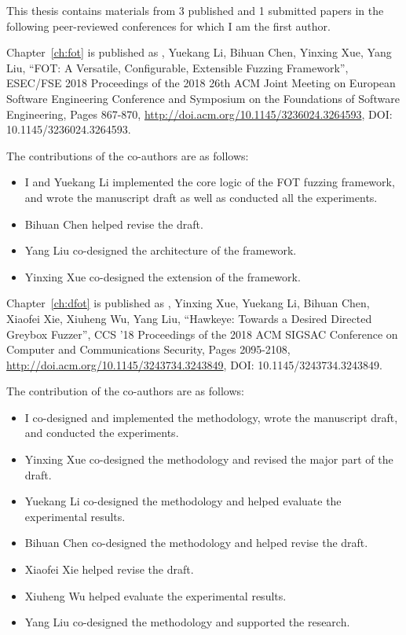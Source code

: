 \noindent This thesis contains materials from 3 published and 1 submitted papers in the following peer-reviewed conferences for which I am the first author.

\noindent Chapter~\ref{ch:fot} is published as \myname, Yuekang Li, Bihuan Chen, Yinxing Xue, Yang Liu, ``FOT: A Versatile, Configurable, Extensible Fuzzing Framework'', ESEC/FSE 2018 Proceedings of the 2018 26th ACM Joint Meeting on European Software Engineering Conference and Symposium on the Foundations of Software Engineering, Pages 867-870, \url{http://doi.acm.org/10.1145/3236024.3264593}, DOI: 10.1145/3236024.3264593.

\noindent The contributions of the co-authors are as follows:
\begin{itemize}
  \item I and Yuekang Li implemented the core logic of the FOT fuzzing framework, and wrote the manuscript draft as well as conducted all the experiments.
  \item Bihuan Chen helped revise the draft.
  \item Yang Liu co-designed the architecture of the framework.
  \item Yinxing Xue co-designed the \dFOT extension of the framework.
\end{itemize}

\noindent Chapter~\ref{ch:dfot} is published as \myname, Yinxing Xue, Yuekang Li, Bihuan Chen, Xiaofei Xie, Xiuheng Wu, Yang Liu, ``Hawkeye: Towards a Desired Directed Greybox Fuzzer'', CCS '18 Proceedings of the 2018 ACM SIGSAC Conference on Computer and Communications Security, Pages 2095-2108, \url{http://doi.acm.org/10.1145/3243734.3243849}, DOI: 10.1145/3243734.3243849.

\noindent The contribution of the co-authors are as follows:
\begin{itemize}
	\item I co-designed and implemented the methodology, wrote the manuscript draft, and conducted the experiments.
	\item Yinxing Xue co-designed the methodology and revised the major part of the draft.
	\item Yuekang Li co-designed the methodology and helped evaluate the experimental results.
	\item Bihuan Chen co-designed the methodology and helped revise the draft.
	\item Xiaofei Xie helped revise the draft.
	\item Xiuheng Wu helped evaluate the experimental results.
	\item Yang Liu co-designed the methodology and supported the research.
\end{itemize}

